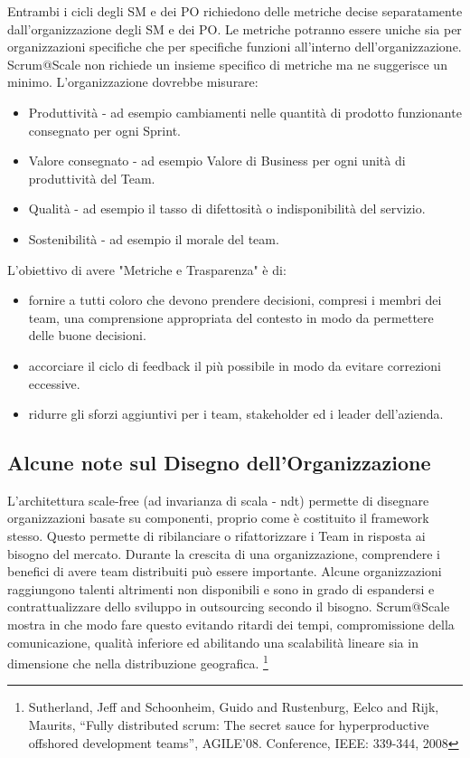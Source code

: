 \documentclass[italian,12pt,a4paper,parskip=full]{scrartcl}
\begin{document}
Entrambi i cicli degli SM e dei PO richiedono delle metriche decise separatamente
dall'organizzazione degli SM e dei PO. Le metriche potranno essere uniche sia per
organizzazioni specifiche che per specifiche funzioni all'interno dell'organizzazione.
Scrum@Scale non richiede un insieme specifico di metriche ma ne suggerisce un
minimo. L'organizzazione dovrebbe misurare:
\begin{itemize}
\item Produttività - ad esempio cambiamenti nelle quantità di prodotto funzionante
consegnato per ogni Sprint.
\item Valore consegnato - ad esempio Valore di Business per ogni unità di produttività del Team.
\item Qualità - ad esempio il tasso di difettosità o indisponibilità del servizio.
\item Sostenibilità - ad esempio il morale del team.
\end{itemize}
L'obiettivo di avere "Metriche e Trasparenza" è di:
\begin{itemize}
 \item fornire a tutti coloro che devono prendere decisioni, compresi i membri dei
 team, una comprensione appropriata del contesto in modo da permettere delle
 buone decisioni.
\item accorciare il ciclo di feedback il più possibile in modo da evitare correzioni eccessive.
\item ridurre gli sforzi aggiuntivi per i team, stakeholder ed i leader dell'azienda.
 \end{itemize}

\subsection{Alcune note sul Disegno dell'Organizzazione}
L'architettura scale-free (ad invarianza di scala - ndt) permette di disegnare organizzazioni
basate su componenti, proprio come è costituito il framework stesso. Questo permette di
ribilanciare o rifattorizzare i Team in risposta ai bisogno del mercato. Durante la crescita
di una organizzazione, comprendere i benefici di avere team distribuiti può essere importante. Alcune organizzazioni raggiungono talenti altrimenti non disponibili e sono
in grado di espandersi e contrattualizzare dello sviluppo in outsourcing secondo il bisogno. Scrum@Scale mostra in che modo fare questo evitando ritardi dei tempi,
compromissione della comunicazione, qualità inferiore ed abilitando una scalabilità
lineare sia in dimensione che nella distribuzione geografica. \footnote{Sutherland, Jeff and Schoonheim, Guido and Rustenburg, Eelco and Rijk, Maurits, ``Fully distributed scrum:
The secret sauce for hyperproductive offshored development teams'',
AGILE'08. Conference, IEEE: 339-344, 2008}
\end{document}
